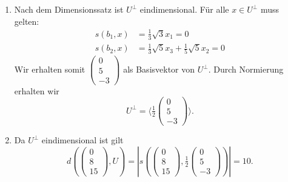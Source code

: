 \begin{enumerate}
\begin{equation*}
\begin{pmatrix}
				0 \\ \sqrt{5} \\ 0
			\end{pmatrix} \right\}\text{.}
		\end{equation*}
	\item Nach dem Dimensionssatz ist \( U^\perp \) eindimensional. Für alle \( x \in U^\perp \) muss gelten:
		\begin{align*}
			s(b_1,x) &= \tfrac{1}{3}\sqrt{3}x_1 = 0 \\
			s(b_2,x) &= \tfrac{1}{3}\sqrt{5}x_3 + \tfrac{1}{5}\sqrt{5}x_2 = 0
		\end{align*}
		Wir erhalten somit \( \left( \begin{smallmatrix}
				0 \\ 5 \\ -3
			\end{smallmatrix} \right) \) als Basisvektor von \( U^\perp \). Durch Normierung erhalten wir
		\begin{equation*}
			U^\perp = \langle \tfrac{1}{2} \left(\begin{smallmatrix}
				0 \\ 5 \\ -3
			\end{smallmatrix} \right) \rangle\text{.}
		\end{equation*}
	\item Da \( U^\perp \) eindimensional ist gilt
		\begin{equation*}
			d\left( \left(\begin{smallmatrix}
				0 \\ 8 \\ 15
			\end{smallmatrix} \right),U \right) = |s\left( \left(\begin{smallmatrix}
				0 \\ 8 \\ 15
			\end{smallmatrix} \right), \tfrac{1}{2}\left(\begin{smallmatrix}
				0 \\ 5 \\ -3
			\end{smallmatrix} \right) \right)| = 10\text{.}
		\end{equation*}
\end{enumerate}

\newpage

